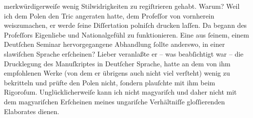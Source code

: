                merkwürdigerweiſe wenig Stilwidrigkeiten zu regiſtrieren gehabt. Warum? Weil ich dem
                  Polen den Tric angeraten hatte, dem Profeſſor von vornherein
               weiszumachen, er werde{ }ſeine Diſſertation polniſch drucken laſſen. Da begann des Profeſſors Eigenliebe und Nationalgefühl zu funktionieren.
               Eine aus{ }ſeinem, einem Deutſchen Seminar hervorgegangene Abhandlung{ }ſollte anderswo,
               in einer slawiſchen Sprache erſcheinen? Lieber veranlaßte er – was beabſichtigt war –
               die Drucklegung des Manuſkriptes in Deutſcher Sprache, {\pb}hatte an dem von ihm empfohlenen Werke (von dem er übrigens auch
               nicht viel verſteht) wenig zu bekritteln und prüfte den Polen nicht,{ }ſondern plauſchte mit ihm beim
               Rigoroſum. Unglücklicherweiſe kann ich nicht magyariſch und daher nicht mit dem magyariſchen Erſcheinen meines ungariſche Verhältniſſe gloſſierenden Elaborates dienen.\pend
           
